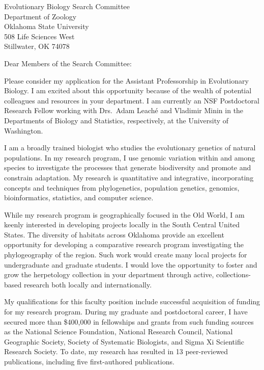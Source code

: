 \documentclass[letterpaper, 10pt]{letter}
\begin{document}
\begin{letter}{Evolutionary Biology Search Committee \\
                     Department of Zoology \\
                     Oklahoma State University \\
                     508 Life Sciences West \\
                     Stillwater, OK 74078}
\opening{Dear Members of the Search Committee:}
Please consider my application for the Assistant Professorship in Evolutionary
Biology.
I am excited about this opportunity because of the wealth of potential
colleagues and resources in your department.
I am currently an NSF Postdoctoral Research Fellow working with Drs.\ Adam
Leach\'{e} and Vladimir Minin in the Departments of Biology and
Statistics, respectively, at the University of Washington.

I am a broadly trained biologist who studies the evolutionary genetics of
natural populations.
In my research program, I use genomic variation within and among species to
investigate the processes that generate biodiversity and promote and constrain
adaptation.
My research is quantitative and integrative, incorporating concepts and
techniques from phylogenetics, population genetics, genomics, bioinformatics,
statistics, and computer science.

While my research program is geographically focused in the Old World, I am
keenly interested in developing projects locally in the South Central
United States.
The diversity of habitats across Oklahoma provide an excellent opportunity
for developing a comparative research program investigating the
phylogeography of the region.
Such work would create many local projects for undergraduate and graduate
students.
I would love the opportunity to foster and grow the herpetology collection
in your department through active, collections-based research both locally
and internationally.

My qualifications for this faculty position include successful acquisition
of funding for my research program.
During my graduate and postdoctoral career, I have secured more than
\$400,000 in fellowships and grants from such funding sources as the 
National Science Foundation,
National Research Council,
National Geographic Society,
Society of Systematic Biologists, and
Sigma Xi Scientific Research Society.
To date, my research has resulted in 13 peer-reviewed publications,
including five first-authored publications.


\end{letter}
\end{document}
